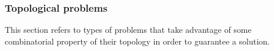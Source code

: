 \begin{table}[h!]
    \centering
     \quad
     \quad

    \caption{Three-valued logic \cite{kleene_IntroductionMetamathematics_2009}.}\label{tab:three-val-logic}
\end{table}



\subsubsection{Topological problems}

This section refers to types of problems that take advantage of some combinatorial property
of their topology in order to guarantee a solution.

